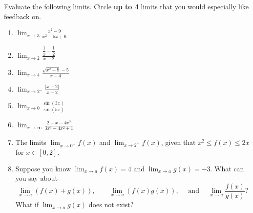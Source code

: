 \documentclass[12pt]{article}
\newcommand{\di}{\displaystyle}
\newcommand{\abs}[1]{\lvert #1\rvert}
\begin{document}
Evaluate the following limits. Circle \textbf{up to 4} limits that you would especially like feedback on.
  \begin{enumerate}
    \item $\di \lim_{x\to 3}\frac{x^2-9}{x^2-5x+6}$
    
    \vspace{1.75in}
    
    \item $\di \lim_{x\to 2}\frac{\dfrac{1}{x}-\dfrac{1}{2}}{x-2}$
    
    \vspace{1.75in}
    
    \item $\di \lim_{x\to 4}\frac{\sqrt{x^2+9}-5}{x-4}$
    
    \vspace{1.75in}
    
    \item $\di\lim_{x\to 2^-}\frac{\abs{x-2}}{x-2}$
    
    \newpage
    
    \item $\di \lim_{x\to 0}\frac{\sin(3x)}{\sin(5x)}$
    
    \vspace{1.75in}
    
       
    \item $\di \lim_{x\to\infty}\frac{2+x-4x^3}{3x^3-4x^2+1}$
    
    \vspace{1.75in}
    
    \item The limits $\di\lim_{x\to 0^+}f(x)$ and $\di \lim_{x\to 2^-}f(x)$, given that $x^2\leq f(x)\leq 2x$ for $x\in [0,2]$.
  

   \vspace{1.5in}
   
   \item Suppose you know $\di\lim_{x\to a}f(x)=4$ and $\di \lim_{x\to a}g(x)=-3$. What can you say about
   \[
   \lim_{x\to a}(f(x)+g(x)), \quad\quad \lim_{x\to a}(f(x)g(x)),\quad \text{ and } \quad \lim_{x\to a} \frac{f(x)}{g(x)}?
   \]
   What if $\di\lim_{x\to a}g(x)$ does not exist?
  \end{enumerate}
\end{document}
